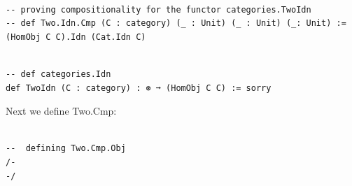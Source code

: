 \documentclass{book}
\newcounter{lcounter}
\begin{document}
\begin{center}
\begin{tcolorbox}[width=5in,colback={white},title={\begin{center}\texttt{Lean \thelcounter} \addtocounter{lcounter}{1}  \end{center}},colbacktitle=Blue,coltitle=black]
\begin{verbatim}

-- proving compositionality for the functor categories.TwoIdn
-- def Two.Idn.Cmp (C : category) (_ : Unit) (_ : Unit) (_: Unit) := (HomObj C C).Idn (Cat.Idn C)

\end{verbatim}%
\end{tcolorbox}
\end{center}


\begin{center}
\begin{tcolorbox}[width=5in,colback={white},title={\begin{center}\texttt{Lean \thelcounter} \addtocounter{lcounter}{1}  \end{center}},colbacktitle=Blue,coltitle=black]
\begin{verbatim}

-- def categories.Idn
def TwoIdn (C : category) : ⊛ ➞ (HomObj C C) := sorry

\end{verbatim}%
\end{tcolorbox}
\end{center}

Next we define Two.Cmp:\\

\begin{center}
\begin{tcolorbox}[width=5in,colback={white},title={\begin{center}\texttt{Lean \thelcounter} \addtocounter{lcounter}{1}  \end{center}},colbacktitle=Blue,coltitle=black]
\begin{verbatim}

--  defining Two.Cmp.Obj
/-
-/

\end{verbatim}%
\end{tcolorbox}
\end{center}
\end{document}
